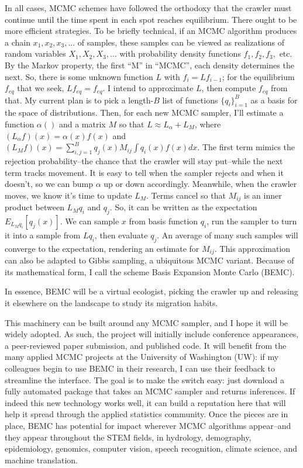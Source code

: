 \documentclass[11pt,letterpaper]{article}
\begin{document}
In all cases, MCMC schemes have followed the orthodoxy that the crawler must continue until the time spent in each spot reaches equilibrium. There ought to be more efficient strategies. To be briefly technical, if an MCMC algorithm produces a chain $ x_1, x_2, x_3, ...$ of samples, these samples can be viewed as realizations of random variables $X_1, X_2, X_3, ...$ with probability density functions $f_1, f_2, f_3, $ etc. By the Markov property, the first ``M'' in ``MCMC'', each density determines the next. So, there is some unknown function $L$ with $f_i=Lf_{i-1}$; for the equilibrium $f_{eq}$ that we seek, $Lf_{eq}=f_{eq}$. I intend to approximate $L$, then compute $f_{eq}$ from that. My current plan is to pick a length-$B$ list of functions $\{q_i\}_{i=1}^B$ as a basis for the space of distributions. Then, for each new MCMC sampler, I'll estimate a function $\alpha()$ and a matrix $M$ so that $L \approx L_{\alpha}+L_{M}$, where $ (L_{\alpha}f)(x) = \alpha(x)f(x)$ and $(L_{M}f)(x) =  \sum_{i,j=1}^B q_j(x)M_{ij}\int q_i(x)f(x)dx$. The first term mimics the rejection probability--the chance that the crawler will stay put--while the next term tracks movement. It is easy to tell when the sampler rejects and when it doesn't, so we can bump $\alpha$ up or down accordingly. Meanwhile, when the crawler moves, we know it's time to update $L_{M}$. Terms cancel so that $M_{ij}$ is an inner product between $L_{M}q_i$ and $q_j$. So, it can be written as the expectation $E_{L_{M}q_i}[q_j(x)]$. We can sample $x$ from basis function $q_i$, run the sampler to turn it into a sample from $Lq_i$, then evaluate $q_j$. An average of many such samples will converge to the expectation, rendering an estimate for $M_{ij}$. This approximation can also be adapted to Gibbs sampling, a ubiquitous MCMC variant. Because of its mathematical form, I call the scheme Basis Expansion Monte Carlo (BEMC). 

In essence, BEMC will be a virtual ecologist, picking the crawler up and releasing it elsewhere on the landscape to study its migration habits.

This machinery can be built around any MCMC sampler, and I hope it will be widely adopted. As such, the project will initially include conference appearances, a peer-reviewed paper submission, and published code. It will benefit from the many applied MCMC projects at the University of Washington (UW): if my colleagues begin to use BEMC in their research, I can use their feedback to streamline the interface. The goal is to make the switch easy: just download a fully automated package that takes an MCMC sampler and returns inferences. If indeed this new technology works well, it can build a reputation here that will help it spread through the applied statistics community. Once the pieces are in place, BEMC has potential for impact wherever MCMC algorithms appear--and they appear throughout the STEM fields, in hydrology, demography, epidemiology, genomics, computer vision, speech recognition, climate science, and machine translation.
\end{document}
